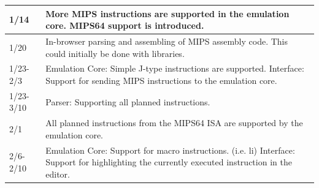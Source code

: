 \documentclass[
    paper=letter,
    parskip=half,
    fontsize=12pt,
    titlepage=firstiscover,
    toc=bibliography,
    numbers=endperiod
]{scrartcl}
\begin{document}
{\begin{tabularx}{\textwidth}{|l|X|}
        1/14          & More MIPS instructions are supported in the emulation core. MIPS64 support is introduced.                                                                                                                                                                                                                                                                                                                                            \\\hline
        1/20          & In-browser parsing and assembling of MIPS assembly code. This could initially be done with libraries.                                                                                                                                                                                                                                                                                                                                \\\hline
        1/23-2/3      & Emulation Core: Simple J-type instructions are supported. \newline Interface: Support for sending MIPS instructions to the emulation core.                                                                                                                                                                                                                                                                                           \\\hline
        1/23-3/10     & Parser: Supporting all planned instructions.                                                                                                                                                                                                                                                                                                                                                                                         \\\hline
        2/1           & All planned instructions from the MIPS64 ISA are supported by the emulation core.                                                                                                                                                                                                                                                                                                                                                    \\\hline
        2/6-2/10      & Emulation Core: Support for macro instructions. (i.e. li) \newline Interface: Support for highlighting the currently executed instruction in the editor.                                                                                                                                                                                                                                                                             \\\hline

\end{tabularx}}
\end{document}
